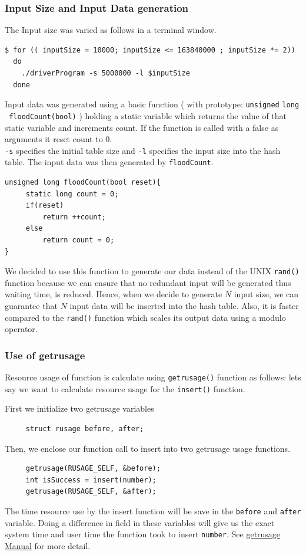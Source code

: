 \documentclass[a4paper,12pt, openany]{book}
\begin{document}
\subsubsection{Input Size and  Input Data generation}
The Input size was varied as follows in a terminal window.
\begin{verbatim}
$ for (( inputSize = 10000; inputSize <= 163840000 ; inputSize *= 2))
  do
    ./driverProgram -s 5000000 -l $inputSize
  done
\end{verbatim} 
 
Input data was generated using a basic function ( with prototype: \texttt{unsigned} \texttt{long}\\ \texttt{ floodCount(bool)} ) holding a static variable which returns the value of that static variable and increments count. If the function is called with a false as arguments it reset count to 0.\\

\texttt{-s} specifies the initial table size and \texttt{-l} specifies the input size into the hash table. The input data was then generated by \texttt{floodCount}.


\begin{verbatim}
unsigned long floodCount(bool reset){
     static long count = 0;
     if(reset)
         return ++count;
     else
         return count = 0;
}
\end{verbatim}

We decided to use this function to generate our data instead of the UNIX \texttt{rand()} function because we can ensure that no redundant input will be generated thus waiting time, is reduced. Hence, when we decide to generate $N$ input size, we can guarantee that $N$ input data will be inserted into the hash table. Also, it is faster compared to the \texttt{rand()} function which scales its output data using a modulo operator. 

\subsubsection{Use of getrusage}

Resource usage of function is calculate using \texttt{getrusage()} function as follows: lets say we want to calculate resource usage for the \texttt{insert()} function. 

First we initialize two getrusage variables 
\begin{verbatim}
     struct rusage before, after;
\end{verbatim}
Then, we enclose our function call to insert into two getrusage usage functions.
\begin{verbatim}
     getrusage(RUSAGE_SELF, &before);
     int isSuccess = insert(number);
     getrusage(RUSAGE_SELF, &after);
\end{verbatim}
The time resource use by the insert function will be save in the \texttt{before} and \texttt{after} variable. Doing a difference in field in these variables will give us the exact system time and user time the function took to insert \texttt{number}. See \href{http://man7.org/linux/man-pages/man2/getrusage.2.html}{getrusage Manual} for more detail. 
\end{document}
